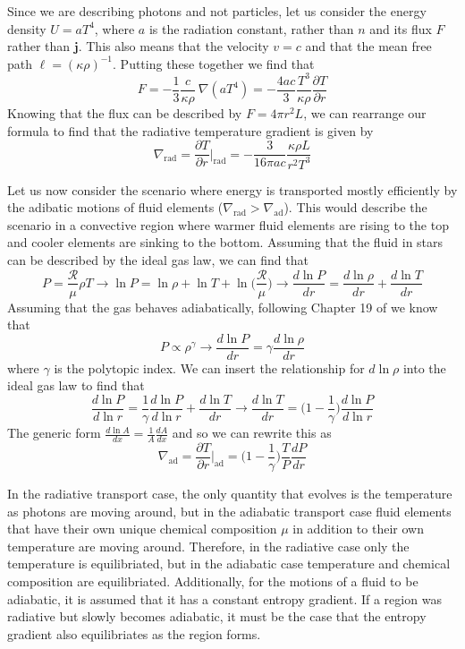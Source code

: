 Since we are describing photons and not particles, let us consider the energy density $U=aT^4$, where $a$ is the radiation constant, rather than $n$ and its flux $F$ rather than $\mathbf{j}$.
This also means that the velocity $v=c$ and that the mean free path $\ell=(\kappa\rho)^{-1}$.
Putting these together we find that
\[
    F = -\frac{1}{3}\frac{c}{\kappa\rho}~\nabla(aT^4)=-\frac{4ac}{3}\frac{T^3}{\kappa\rho}\frac{\partial T}{\partial r}
\]
Knowing that the flux can be described by $F=4\pi r^2 L$, we can rearrange our formula to find that the radiative temperature gradient is given by
\begin{equation}\label{eq:nabla_rad}
\nabla_\mathrm{rad} = \frac{\partial T}{\partial r}\Bigg|_{\mathrm{rad}} = -\frac{3}{16\pi ac}\frac{\kappa\rho L}{r^2T^3}
\end{equation}

Let us now consider the scenario where energy is transported mostly efficiently by the adibatic motions of fluid elements ($\nabla_{\mathrm{rad}} > \nabla_{\mathrm{ad}}$).
This would describe the scenario in a convective region where warmer fluid elements are rising to the top and cooler elements are sinking to the bottom.
Assuming that the fluid in stars can be described by the ideal gas law, we can find that
\[
    P=\frac{\mathscr{R}}{\mu}\rho T \rightarrow \ln P = \ln\rho +\ln T +\ln\Biggl(\frac{\mathscr{R}}{\mu}\Biggr)\rightarrow \frac{d\ln P}{d r}=\frac{d\ln\rho}{dr}+\frac{d\ln T}{dr}
\]
Assuming that the gas behaves adiabatically, following Chapter 19 of \cite{kippenhahnStellarStructureEvolution2013} we know that
\[
    P \propto \rho^\gamma \rightarrow \frac{d \ln P}{dr} = \gamma \frac{d\ln\rho}{dr}
\]
where $\gamma$ is the polytopic index.
We can insert the relationship for $d\ln\rho$ into the ideal gas law to find that
\[
    \frac{d\ln P}{d\ln r} = \frac{1}{\gamma}\frac{d\ln P}{d\ln r} + \frac{d\ln T}{dr} \rightarrow \frac{d\ln T}{dr} = \Biggl(1-\frac{1}{\gamma}\Biggr)\frac{d\ln P}{d\ln r}
\]
The generic form $\frac{d\ln A}{dx} = \frac{1}{A}\frac{dA}{dx}$ and so we can rewrite this as
\begin{equation}\label{eq:nabla_ad}
    \nabla_{\mathrm{ad}}=\frac{\partial T}{\partial r}\Bigg|_{\mathrm{ad}}= \Biggl(1-\frac{1}{\gamma}\Biggr)\frac{T}{P}\frac{dP}{dr}
\end{equation}

In the radiative transport case, the only quantity that evolves is the temperature as photons are moving around, but in the adiabatic transport case fluid elements that have their own unique chemical composition $\mu$ in addition to their own temperature are moving around. 
Therefore, in the radiative case only the temperature is equilibriated, but in the adiabatic case temperature and chemical composition are equilibriated.
Additionally, for the motions of a fluid to be adiabatic, it is assumed that it has a constant entropy gradient.
If a region was radiative but slowly becomes adiabatic, it must be the case that the entropy gradient also equilibriates as the region forms.

